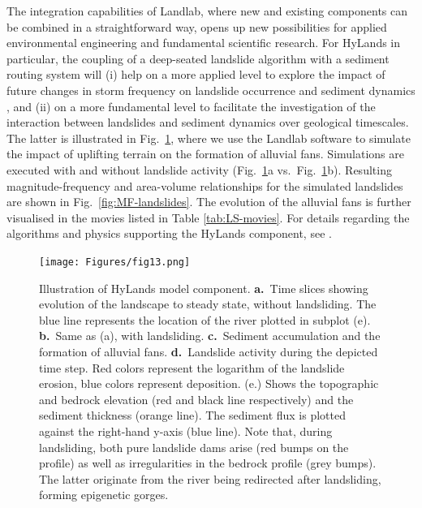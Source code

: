 \documentclass[journal abbreviation, manuscript]{copernicus}
\begin{document}
The integration capabilities of Landlab, where new and existing components can be combined in a straightforward way, opens up new possibilities for applied environmental engineering and fundamental scientific research. For HyLands in particular, the coupling of a deep-seated landslide algorithm with a sediment routing system will (i) help on a more applied level to explore the impact of future changes in storm frequency on landslide occurrence and sediment dynamics \citep{Fan2019}, and (ii) on a more fundamental level to facilitate the investigation of the interaction between landslides and sediment dynamics over geological timescales. The latter is illustrated in Fig.~\ref{fig:landslides}, where we use the Landlab software to simulate the impact of uplifting terrain on the formation of alluvial fans. Simulations are executed with and without landslide activity (Fig.~\ref{fig:landslides}a vs.\ Fig.~\ref{fig:landslides}b). Resulting magnitude-frequency and area-volume relationships for the simulated landslides are shown in Fig.~\ref{fig:MF-landslides}. The evolution of the alluvial fans is further visualised in the movies listed in Table \ref{tab:LS-movies}. For details regarding the algorithms and physics supporting the HyLands component, see \cite{campforts2020hylands}.

\begin{figure}
\texttt{[image: Figures/fig13.png]}
\caption{Illustration of HyLands model component. \textbf{a.}\ Time slices showing evolution of the landscape to steady state, without landsliding. The blue line represents the location of the river plotted in subplot (e). \textbf{b.}\ Same as (a), with landsliding. \textbf{c.}\ Sediment accumulation and the formation of alluvial fans. \textbf{d.}\ Landslide activity during the depicted time step. Red colors represent the logarithm of the landslide erosion, blue colors represent deposition. (e.) Shows the topographic and bedrock elevation (red and black line respectively) and the sediment thickness (orange line). The sediment flux is plotted against the right-hand y-axis (blue line). Note that, during landsliding, both pure landslide dams arise (red bumps on the profile) as well as irregularities in the bedrock profile (grey bumps). The latter originate from the river being redirected after landsliding, forming epigenetic gorges.}
\label{fig:landslides}
\end{figure}
\end{document}
